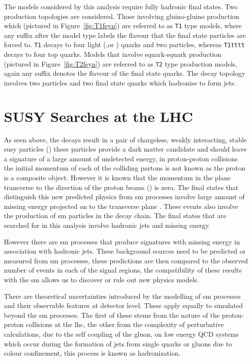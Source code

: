 The models considered by this analysis require fully hadronic final states. Two 
production topologies are considered. Those involving gluino-gluino production which (pictured in Figure~\ref{fig:T1feyn}) are referred to as \texttt{T1} type models, 
where any suffix after the model type labels the flavour that the final state particles are forced to. \texttt{T1} decays to four light (\Pup,\Pdown or \Pcharm) quarks and two \PSneutralino particles, whereas \texttt{T1tttt} decays to four top quarks.
Models that involve squark-squark production (pictured in Figure~\ref{fig:T2feyn}) are referred to as \texttt{T2} type production models, again any suffix denotes the flavour of the final state quarks. The decay topology involves two \PSneutralino particles and two final state quarks which hadronise to form jets.


\section{SUSY Searches at the LHC} %
\label{cha:motivating_the_alt_analysis}

As seen above, the decays result in a pair of chargeless, weakly interacting, stable \ac{susy} particles (\HepProcess{\PSneutralino}) these particles  provide a dark matter candidate and should leave a signature of a large amount of undetected energy, in proton-proton collisions the initial momentum of each of the colliding partons is not known as the proton is a composite object. However it is known that the momentum in the plane transverse to the direction of the proton beams (\pt) is zero. The final states that distinguish this new 
predicted physics from \ac{sm} processes involve large amount of missing energy 
projected on to the transverse plane \ETm. These events also involve the 
production of \ac{sm} particles in the decay chain. The final states that are 
searched for in this analysis involve hadronic jets and missing energy.

However there are \ac{sm} processes that produce signatures with missing energy 
in association with hadronic jets. These background sources need to be 
predicted or measured from \ac{sm} processes, these predictions are then 
compared to the observed number of events in each of the signal regions, the 
compatibility of these results with the \ac{sm} allows us to discover or rule 
out new physics models.

There are theoretical uncertainties introduced by the modelling of \ac{sm} 
processes and their observable features at detector level. These apply equally 
to simulated beyond the \ac{sm} processes. The first of these stems from the 
nature of the proton-proton collisions at the \ac{lhc}, the other from the 
complexity of perturbative calculations, due to the self coupling of the gluon, 
on low energy QCD systems which occur during the formation of jets from single 
quarks or gluons due to colour confinement, this process is known as 
hadronization.

